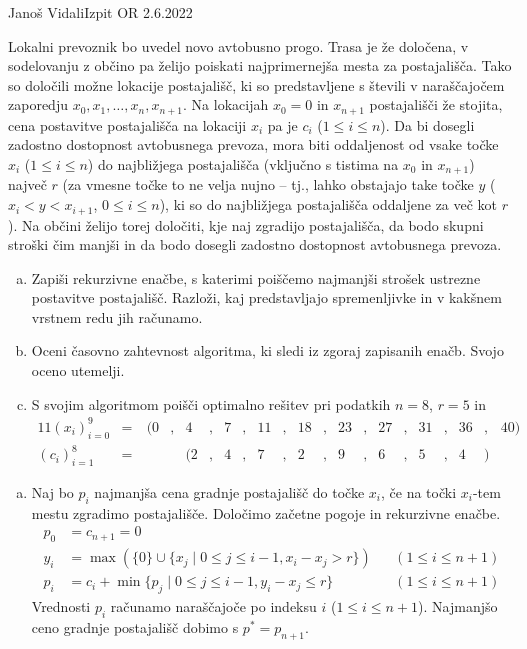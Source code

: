 \begin{naloga}{Janoš Vidali}{Izpit OR 2.6.2022}
\begin{vprasanje}
Lokalni prevoznik bo uvedel novo avtobusno progo.
Trasa je že določena,
v sodelovanju z občino pa želijo poiskati najprimernejša mesta za postajališča.
Tako so določili možne lokacije postajališč,
ki so predstavljene s števili v naraščajočem zaporedju
$x_0, x_1, \dots, x_n, x_{n+1}$.
Na lokacijah $x_0 = 0$ in $x_{n+1}$ postajališči že stojita,
cena postavitve postajališča na lokaciji $x_i$ pa je $c_i$ ($1 \le i \le n$).
Da bi dosegli za\-dost\-no dostopnost avtobusnega prevoza,
mora biti oddaljenost od vsake točke $x_i$ ($1 \le i \le n$)
do najbližjega postajališča (vključno s tistima na $x_0$ in $x_{n+1}$)
največ $r$
(za vmesne točke to ne velja nujno --
tj., lahko obstajajo take točke $y$ ($x_i < y < x_{i+1}$, $0 \le i \le n$),
ki so do najbližjega postajališča oddaljene za več kot $r$).
Na občini želijo torej določiti,
kje naj zgradijo postajališča,
da bodo skupni stroški čim manjši
in da bodo dosegli zadostno dostopnost avtobusnega prevoza.

\begin{enumerate}[(a)]
\item Zapiši rekurzivne enačbe,
s katerimi poiščemo najmanjši strošek ustrezne postavitve postajališč.
Razloži,
kaj predstavljajo spremenljivke in v kakšnem vrstnem redu jih računamo.

\item Oceni časovno zahtevnost algoritma, ki sledi iz zgoraj zapisanih enačb.
Svojo oceno utemelji.

\item S svojim algoritmom poišči optimalno rešitev pri podatkih
$n = 8$, $r = 5$ in
\begin{alignat*}{11}
(x_i)_{i=0}^9 &=&\ (0 &,& 4 &,& 7 &,& 11 &,& 18 &,& 23 &,& 27 &,& 31 &,& 36 &,& 40) \\
(c_i)_{i=1}^8 &=&&& (2 &,& 4 &,& 7 &,& 2 &,& 9 &,& 6 &,& 5 &,& 4 &)
\end{alignat*}
\end{enumerate}
\end{vprasanje}

\begin{odgovor}
\begin{enumerate}[(a)]
\item Naj bo $p_i$ najmanjša cena gradnje postajališč do točke $x_i$,
če na točki $x_i$-tem mestu zgradimo postajališče.
Določimo začetne pogoje in rekurzivne enačbe.
\begin{align*}
p_0 &= c_{n+1} = 0 \\
y_i &= \max\left(\{0\} \cup \{x_j \mid 0 \le j \le i-1, x_i - x_j > r\}\right) && (1 \le i \le n + 1) \\
p_i &= c_i + \min\{p_j \mid 0 \le j \le i-1, y_i - x_j \le r\} && (1 \le i \le n + 1)
\end{align*}
Vrednosti $p_i$ računamo naraščajoče po indeksu $i$ ($1 \le i \le n + 1$).
Najmanjšo ceno gradnje postajališč dobimo s $p^* = p_{n+1}$.


\end{enumerate}
\end{odgovor}
\end{naloga}
